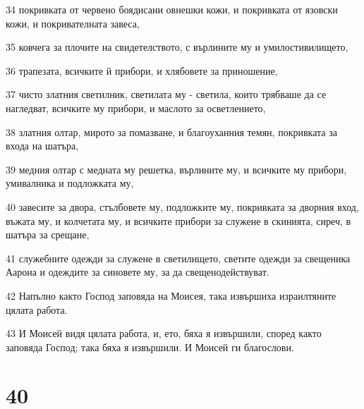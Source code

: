 \par 34 покривката от червено боядисани овнешки кожи, и покривката от язовски кожи, и покривателната завеса,
\par 35 ковчега за плочите на свидетелството, с върлините му и умилостивилището,
\par 36 трапезата, всичките й прибори, и хлябовете за приношение,
\par 37 чисто златния светилник, светилата му - светила, които трябваше да се нагледват, всичките му прибори, и маслото за осветлението,
\par 38 златния олтар, мирото за помазване, и благоуханния темян, покривката за входа на шатъра,
\par 39 медния олтар с медната му решетка, върлините му, и всичките му прибори, умивалника и подложката му,
\par 40 завесите за двора, стълбовете му, подложките му, покривката за дворния вход, въжата му, и колчетата му, и всичките прибори за служене в скинията, сиреч, в шатъра за срещане,
\par 41 служебните одежди за служене в светилището, светите одежди за свещеника Аарона и одеждите за синовете му, за да свещенодействуват.
\par 42 Напълно както Господ заповяда на Моисея, така извършиха израилтяните цялата работа.
\par 43 И Моисей видя цялата работа, и, ето, бяха я извършили, според както заповяда Господ; така бяха я извършили. И Моисей ги благослови.

\chapter{40}

